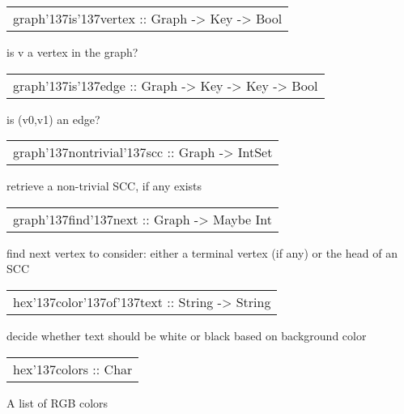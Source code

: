 \begin{haddockdesc}
\item[\begin{tabular}{@{}l}
graph{\char '137}is{\char '137}vertex :: Graph -> Key -> Bool
\end{tabular}]
{\haddockbegindoc
is v a vertex in the graph?\par}
\end{haddockdesc}
\begin{haddockdesc}
\item[\begin{tabular}{@{}l}
graph{\char '137}is{\char '137}edge :: Graph -> Key -> Key -> Bool
\end{tabular}]
{\haddockbegindoc
is (v0,v1) an edge?\par}
\end{haddockdesc}
\begin{haddockdesc}
\item[\begin{tabular}{@{}l}
graph{\char '137}nontrivial{\char '137}scc :: Graph -> IntSet
\end{tabular}]
{\haddockbegindoc
retrieve a non-trivial SCC, if any exists\par}
\end{haddockdesc}
\begin{haddockdesc}
\item[\begin{tabular}{@{}l}
graph{\char '137}find{\char '137}next :: Graph -> Maybe Int
\end{tabular}]
{\haddockbegindoc
find next vertex to consider: either a terminal vertex (if any) or the head of an SCC\par}
\end{haddockdesc}
\begin{haddockdesc}
\item[\begin{tabular}{@{}l}
hex{\char '137}color{\char '137}of{\char '137}text :: String -> String
\end{tabular}]
{\haddockbegindoc
decide whether text should be white or black based on background color\par}
\end{haddockdesc}
\begin{haddockdesc}
\item[\begin{tabular}{@{}l}
hex{\char '137}colors :: {\char 91}{\char 91}Char{\char 93}{\char 93}
\end{tabular}]
{\haddockbegindoc
A list of RGB colors\par}
\end{haddockdesc}